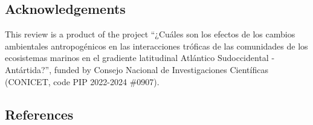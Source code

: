 \documentclass[
]{article}
\begin{document}
\hypertarget{acknowledgements}{%
\subsection{Acknowledgements}\label{acknowledgements}}

This review is a product of the project ``¿Cuáles son los efectos de los
cambios ambientales antropogénicos en las interacciones tróficas de las
comunidades de los ecosistemas marinos en el gradiente latitudinal
Atlántico Sudoccidental - Antártida?'', funded by Consejo Nacional de
Investigaciones Científicas (CONICET, code PIP 2022-2024 \#0907).

\hypertarget{references}{%
\subsection*{References}\label{references}}
\end{document}
